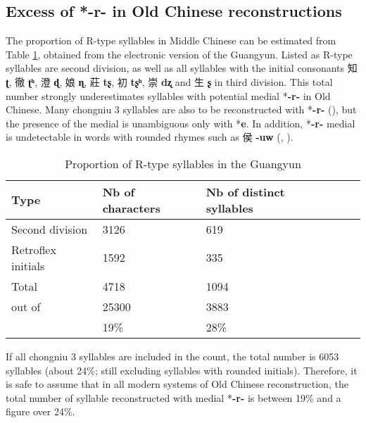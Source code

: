 \documentclass[oneside,a4paper,11pt]{article}
\newcommand{\ipa}[1]{{\phon\mbox{\textbf{#1}}}}
\newcommand{\zh}[1]{{\cn #1}}
\begin{document}
\subsection{Excess of *-r- in Old Chinese reconstructions}
The proportion of R-type syllables in Middle Chinese can be estimated from Table \ref{tab:gy}, obtained from the electronic version of the Guangyun. Listed as R-type syllables are second division, as well as all syllables with the initial consonants \zh{知} \ipa{ʈ}, \zh{徹} \ipa{ʈʰ},  \zh{澄} \ipa{ɖ},  \zh{娘} \ipa{ɳ},  \zh{莊} \ipa{tʂ},  \zh{初} \ipa{tʂʰ},  \zh{崇} \ipa{dʐ} and \zh{生} \ipa{ʂ} in third division. This total number strongly underestimates syllables with potential medial *\ipa{-r-} in Old Chinese. Many chongniu 3 syllables are also to be reconstructed with *\ipa{-r-} (\citealt[217-8]{bs14oc}), but the presence of the medial is unambiguous only with *\ipa{e}.  In addition, *\ipa{-r-} medial is undetectable in words with rounded rhymes such as \zh{侯} \ipa{-uw} (\citealt[362]{starostin89}, \citealt[501]{baxter92}).

\begin{table}
\caption{Proportion of R-type syllables in the Guangyun} \label{tab:gy} \centering
\begin{tabular}{lllll}
\toprule
Type& Nb of characters & Nb of distinct syllables \\
\midrule
Second division	& 3126	 & 619 \\
Retroflex initials & 1592	&335 \\%
\midrule
Total& 4718	&1094 \\
out of &	25300	&3883 \\
	&19\%	&28\% \\
	\bottomrule
\end{tabular}
\end{table}

If all chongniu 3 syllables are included in the count, the total number is 6053 syllables (about 24\%; still excluding syllables with rounded initials). Therefore, it is safe to assume that in all modern systems of Old Chinese reconstruction, the total number of syllable reconstructed with medial *\ipa{-r-} is between 19\% and a figure over 24\%.

\end{document}
